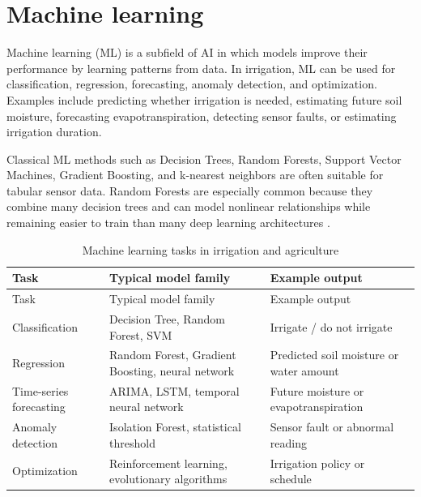 \section{Machine learning}

Machine learning (ML) is a subfield of AI in which models improve their performance by learning patterns from data. In irrigation, ML can be used for classification, regression, forecasting, anomaly detection, and optimization. Examples include predicting whether irrigation is needed, estimating future soil moisture, forecasting evapotranspiration, detecting sensor faults, or estimating irrigation duration.

Classical ML methods such as Decision Trees, Random Forests, Support Vector Machines, Gradient Boosting, and k-nearest neighbors are often suitable for tabular sensor data. Random Forests are especially common because they combine many decision trees and can model nonlinear relationships while remaining easier to train than many deep learning architectures \cite{breiman2001randomforest}.

\begin{footnotesize}
\setlength{\tabcolsep}{2pt}
\begin{longtable}{@{}>{\raggedright\arraybackslash}p{}>{\raggedright\arraybackslash}p{}>{\raggedright\arraybackslash}p{}@{}}
\caption{Machine learning tasks in irrigation and agriculture}\\
\toprule
Task & Typical model family & Example output \\
\midrule
\endfirsthead
\toprule
Task & Typical model family & Example output \\
\midrule
\endhead
Classification & Decision Tree, Random Forest, SVM & Irrigate / do not irrigate \\
Regression & Random Forest, Gradient Boosting, neural network & Predicted soil moisture or water amount \\
Time-series forecasting & ARIMA, LSTM, temporal neural network & Future moisture or evapotranspiration \\
Anomaly detection & Isolation Forest, statistical threshold & Sensor fault or abnormal reading \\
Optimization & Reinforcement learning, evolutionary algorithms & Irrigation policy or schedule \\
\bottomrule
\end{longtable}
\end{footnotesize}

